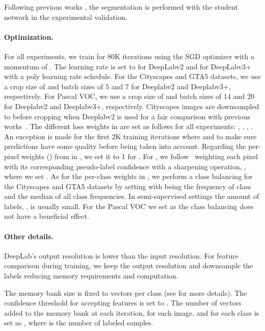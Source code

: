 \documentclass[10pt,twocolumn,letterpaper]{article}
\begin{document}
Following previous works \cite{olsson2021classmix, tarvainen2017mean}, the segmentation is performed with the student network  in the experimental validation.  

\vspace{5mm}
\paragraph{Optimization.}
For all experiments, we train for 80K iterations using the SGD optimizer with a momentum of . The learning rate is set to  for DeepLabv2 and  for DeepLabv3+ with a poly learning rate schedule. For the Cityscapes and GTA5 datasets, we use a crop size of  and batch sizes of 5 and 7 for Deeplabv2 and Deeplabv3+, respectively. For Pascal VOC, we use a crop size of  and batch sizes of 14 and 20 for Deeplabv2 and Deeplabv3+, respectively.
Cityscapes images are downsampled to  before cropping when Deeplabv2 is used for a fair comparison with previous works~\cite{olsson2021classmix, feng2020semiCBC, hung2018adversarial, mittal2019semi}.
The different loss weights in  are set as follows for all experiments: , , , .
An exception is made for the first 2K training iterations where  and  to make sure predictions have some quality before being taken into account.
Regarding the per-pixel weights () from  in , we set it to 1 for . For , we follow~\cite{feng2020semiCBC} weighting each pixel with its corresponding pseudo-label confidence with a sharpening operation, , where we set .
As for the per-class weights  in , we perform a class balancing for the Cityscapes and GTA5 datasets by setting  with  being the frequency of class  and  the median of all class frequencies. 
In semi-supervised settings the amount of labels, , is usually small. 
For the Pascal VOC we set  as the class balancing does not have a beneficial effect.


\vspace{5mm}

\paragraph{Other details.} 
DeepLab's output resolution is  lower than the input resolution. For feature comparison during training, we keep the output resolution and downsample the labels reducing memory requirements and computation.

The memory bank size is fixed to  vectors per class (see  for more details). The confidence threshold  for accepting features is set to . The number of vectors added to the memory bank at each iteration, for each image, and for each class is set as , where  is the number of labeled samples.
 
\end{document}
